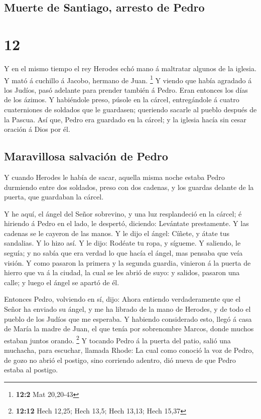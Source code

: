 \hypertarget{muerte-de-santiago-arresto-de-pedro}{%
\subsection{Muerte de Santiago, arresto de
Pedro}\label{muerte-de-santiago-arresto-de-pedro}}

\hypertarget{section-11}{%
\section{12}\label{section-11}}

 Y en el mismo tiempo el rey Herodes echó mano á maltratar
algunos de la iglesia.  Y mató á cuchillo á Jacobo,
hermano de Juan. \footnote{\textbf{12:2} Mat 20,20-43}  Y
viendo que había agradado á los Judíos, pasó adelante para prender
también á Pedro. Eran entonces los días de los ázimos.  Y
habiéndole preso, púsole en la cárcel, entregándole á cuatro
cuaterniones de soldados que le guardasen; queriendo sacarle al pueblo
después de la Pascua.  Así que, Pedro era guardado en la
cárcel; y la iglesia hacía sin cesar oración á Dios por él.

\hypertarget{maravillosa-salvaciuxf3n-de-pedro}{%
\subsection{Maravillosa salvación de
Pedro}\label{maravillosa-salvaciuxf3n-de-pedro}}

 Y cuando Herodes le había de sacar, aquella misma noche
estaba Pedro durmiendo entre dos soldados, preso con dos cadenas, y los
guardas delante de la puerta, que guardaban la cárcel.

 Y he aquí, el ángel del Señor sobrevino, y una luz
resplandeció en la cárcel; é hiriendo á Pedro en el lado, le despertó,
diciendo: Levántate prestamente. Y las cadenas se le cayeron de las
manos.  Y le dijo el ángel: Cíñete, y átate tus sandalias.
Y lo hizo así. Y le dijo: Rodéate tu ropa, y sígueme.  Y
saliendo, le seguía; y no sabía que era verdad lo que hacía el ángel,
mas pensaba que veía visión.  Y como pasaron la primera y
la segunda guardia, vinieron á la puerta de hierro que va á la ciudad,
la cual se les abrió de suyo: y salidos, pasaron una calle; y luego el
ángel se apartó de él.

 Entonces Pedro, volviendo en sí, dijo: Ahora entiendo
verdaderamente que el Señor ha enviado su ángel, y me ha librado de la
mano de Herodes, y de todo el pueblo de los Judíos que me esperaba.
 Y habiendo considerado esto, llegó á casa de María la
madre de Juan, el que tenía por sobrenombre Marcos, donde muchos estaban
juntos orando. \footnote{\textbf{12:12} Hech 12,25; Hech 13,5; Hech
  13,13; Hech 15,37}  Y tocando Pedro á la puerta del
patio, salió una muchacha, para escuchar, llamada Rhode: 
La cual como conoció la voz de Pedro, de gozo no abrió el postigo, sino
corriendo adentro, dió nueva de que Pedro estaba al postigo.

